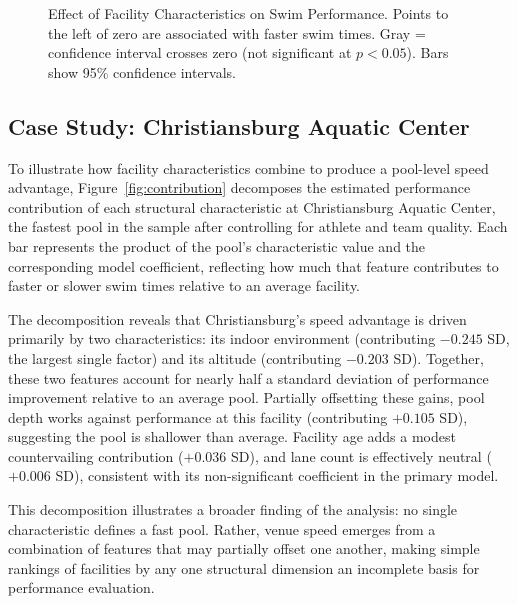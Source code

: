 \documentclass[12pt]{article}
\begin{document}
\begin{figure}[h]
  \centering
  \caption{Effect of Facility Characteristics on Swim Performance. Points to
  the left of zero are associated with faster swim times. Gray = confidence
  interval crosses zero (not significant at $p < 0.05$). Bars show 95\%
  confidence intervals.}
  \label{fig:coef}
\end{figure}

\subsection{Case Study: Christiansburg Aquatic Center}

To illustrate how facility characteristics combine to produce a pool-level
speed advantage, Figure~\ref{fig:contribution} decomposes the estimated
performance contribution of each structural characteristic at Christiansburg
Aquatic Center, the fastest pool in the sample after controlling for athlete and
team quality. Each bar represents the product of the pool's characteristic value
and the corresponding model coefficient, reflecting how much that feature
contributes to faster or slower swim times relative to an average facility.

The decomposition reveals that Christiansburg's speed advantage is driven
primarily by two characteristics: its indoor environment (contributing
$-0.245$ SD, the largest single factor) and its altitude (contributing
$-0.203$ SD). Together, these two features account for nearly half a standard
deviation of performance improvement relative to an average pool. Partially
offsetting these gains, pool depth works against performance at this facility
(contributing $+0.105$ SD), suggesting the pool is shallower than average.
Facility age adds a modest countervailing contribution ($+0.036$ SD), and lane
count is effectively neutral ($+0.006$ SD), consistent with its non-significant
coefficient in the primary model.

This decomposition illustrates a broader finding of the analysis: no single
characteristic defines a fast pool. Rather, venue speed emerges from a
combination of features that may partially offset one another, making simple
rankings of facilities by any one structural dimension an incomplete basis for
performance evaluation.
\end{document}
